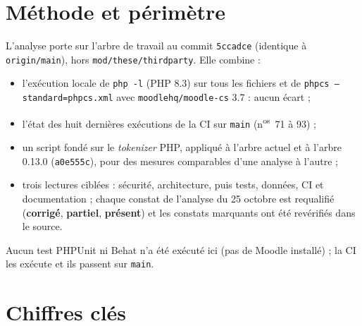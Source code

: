 \documentclass[11pt,a4paper]{article}
\newcommand{\fichier}[1]{\texttt{\small #1}}
\newcommand{\code}[1]{\texttt{#1}}
\newcommand{\corrige}{\textcolor{green!45!black}{\textbf{corrigé}}}
\newcommand{\partiel}{\textcolor{orange!80!black}{\textbf{partiel}}}
\newcommand{\present}{\textcolor{red!70!black}{\textbf{présent}}}
\begin{document}
\section{Méthode et périmètre}

L'analyse porte sur l'arbre de travail au commit \code{5ccadce} (identique à \code{origin/main}),
hors \fichier{mod/these/thirdparty}. Elle combine :
\begin{itemize}
  \item l'exécution locale de \code{php -l} (PHP 8.3) sur tous les fichiers et de
    \code{phpcs --standard=phpcs.xml} avec \code{moodlehq/moodle-cs} 3.7 : aucun écart ;
  \item l'état des huit dernières exécutions de la CI sur \code{main} (n\textsuperscript{os}~71
    à 93) ;
  \item un script fondé sur le \emph{tokenizer} PHP, appliqué à l'arbre actuel et à l'arbre
    0.13.0 (\code{a0e555c}), pour des mesures comparables d'une analyse à l'autre ;
  \item trois lectures ciblées : sécurité, architecture, puis tests, données, CI et
    documentation ; chaque constat de l'analyse du 25 octobre est requalifié (\corrige,
    \partiel, \present) et les constats marquants ont été revérifiés dans le source.
\end{itemize}
Aucun test PHPUnit ni Behat n'a été exécuté ici (pas de Moodle installé) ; la CI les exécute et
ils passent sur \code{main}.

\section{Chiffres clés}
\end{document}
